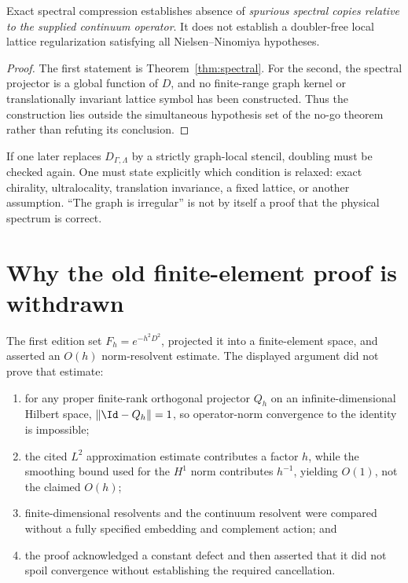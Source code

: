 \documentclass[11pt]{article}
\begin{document}
\begin{proposition}
Exact spectral compression establishes absence of \emph{spurious spectral
copies relative to the supplied continuum operator}. It does not establish a
doubler-free local lattice regularization satisfying all
Nielsen--Ninomiya hypotheses.
\end{proposition}

\begin{proof}
The first statement is Theorem~\ref{thm:spectral}. For the second, the
spectral projector is a global function of \(D\), and no finite-range graph
kernel or translationally invariant lattice symbol has been constructed.
Thus the construction lies outside the simultaneous hypothesis set of the
no-go theorem rather than refuting its conclusion.
\end{proof}

If one later replaces \(D_{\Gamma,\Lambda}\) by a strictly graph-local stencil,
doubling must be checked again. One must state explicitly which condition is
relaxed: exact chirality, ultralocality, translation invariance, a fixed
lattice, or another assumption. ``The graph is irregular'' is not by itself
a proof that the physical spectrum is correct.

\section{Why the old finite-element proof is withdrawn}

The first edition set \(F_h=e^{-h^2D^2}\), projected it into a finite-element
space, and asserted an \(O(h)\) norm-resolvent estimate. The displayed
argument did not prove that estimate:
\begin{enumerate}
\item for any proper finite-rank orthogonal projector \(Q_h\) on an
  infinite-dimensional Hilbert space,
  \(\|\Id-Q_h\|=1\), so operator-norm convergence to the identity is
  impossible;
\item the cited \(L^2\) approximation estimate contributes a factor \(h\),
  while the smoothing bound used for the \(H^1\) norm contributes
  \(h^{-1}\), yielding \(O(1)\), not the claimed \(O(h)\);
\item finite-dimensional resolvents and the continuum resolvent were compared
  without a fully specified embedding and complement action; and
\item the proof acknowledged a constant defect and then asserted that it did
  not spoil convergence without establishing the required cancellation.
\end{enumerate}
\end{document}
